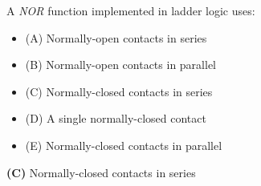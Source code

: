 

A {\it NOR} function implemented in ladder logic uses:

\begin{itemize}
\item{(A)} Normally-open contacts in series
\vskip 5pt 
\item{(B)} Normally-open contacts in parallel
\vskip 5pt 
\item{(C)} Normally-closed contacts in series
\vskip 5pt 
\item{(D)} A single normally-closed contact
\vskip 5pt 
\item{(E)} Normally-closed contacts in parallel
\end{itemize}







{\bf (C)} Normally-closed contacts in series
 










